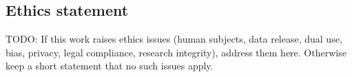 \subsection*{Ethics statement}

TODO: If this work raises ethics issues (human subjects, data release, dual use,
bias, privacy, legal compliance, research integrity), address them here.
Otherwise keep a short statement that no such issues apply.

